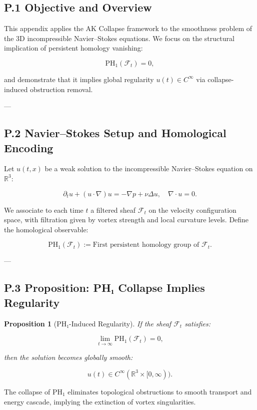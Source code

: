 \documentclass[11pt]{article}
\newtheorem{proposition}[theorem]{Proposition}
\begin{document}
\subsection*{P.1 Objective and Overview}

This appendix applies the AK Collapse framework to the smoothness problem of the 3D incompressible Navier–Stokes equations.  
We focus on the structural implication of persistent homology vanishing:

\[
\mathrm{PH}_1(\mathcal{F}_t) = 0,
\]

and demonstrate that it implies global regularity $u(t) \in C^\infty$ via collapse-induced obstruction removal.

---

\subsection*{P.2 Navier–Stokes Setup and Homological Encoding}

Let $u(t,x)$ be a weak solution to the incompressible Navier–Stokes equation on $\mathbb{R}^3$:

\[
\partial_t u + (u \cdot \nabla)u = -\nabla p + \nu \Delta u, \quad \nabla \cdot u = 0.
\]

We associate to each time $t$ a filtered sheaf $\mathcal{F}_t$ on the velocity configuration space, with filtration given by vortex strength and local curvature levels. Define the homological observable:

\[
\mathrm{PH}_1(\mathcal{F}_t) := \text{First persistent homology group of } \mathcal{F}_t.
\]

---

\subsection*{P.3 Proposition: PH₁ Collapse Implies Regularity}

\begin{proposition}[PH₁-Induced Regularity]
\label{prop:PHcollapse}
If the sheaf $\mathcal{F}_t$ satisfies:

\[
\lim_{t \to \infty} \mathrm{PH}_1(\mathcal{F}_t) = 0,
\]

then the solution becomes globally smooth:

\[
u(t) \in C^\infty(\mathbb{R}^3 \times [0, \infty)).
\]
\end{proposition}

The collapse of $\mathrm{PH}_1$ eliminates topological obstructions to smooth transport and energy cascade, implying the extinction of vortex singularities.
\end{document}
